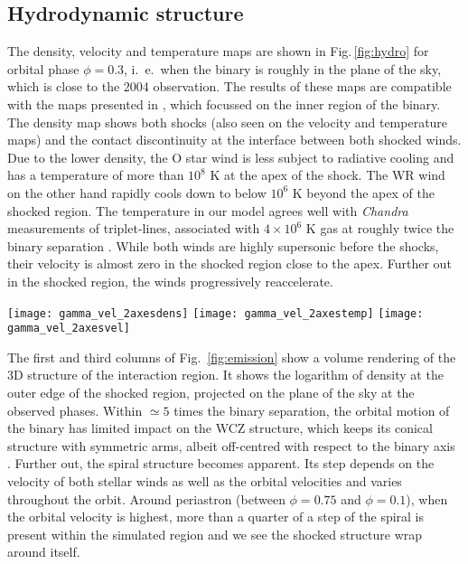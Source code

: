 \documentclass[usenatbib]{mnras}%
\begin{document}
\subsection{Hydrodynamic structure}
The density, velocity and temperature maps are shown in Fig.\,\ref{fig:hydro} for orbital phase $\phi=0.3$, i.\ e.\ when the binary is roughly in the plane of the sky, which is close to the 2004 observation. The results of these maps are compatible with the maps presented in \citet{2005MNRAS.356.1308H}, which focussed on the inner region of the binary. The density map shows both shocks (also seen on the velocity and temperature maps) and the contact discontinuity at the interface between both shocked winds.  Due to the lower density, the O star wind is less subject to radiative cooling and has a temperature of more than $10^8$ K at the apex of the shock. The WR wind on the other hand rapidly cools down to below $10^6$ K beyond the apex of the shocked region. The temperature in our model agrees well with \textit{Chandra} measurements of triplet-lines, associated with $4\times 10^6$ K gas at roughly twice the binary separation \citep{2001ApJ...558L.113S}. While both winds are highly supersonic before the shocks, their velocity is almost zero in the shocked region close to the apex. Further out in the shocked region, the winds progressively reaccelerate.
 \begin{figure*}
   \centering
 \texttt{[image: gamma\_vel\_2axesdens]}
 \texttt{[image: gamma\_vel\_2axestemp]}
 \texttt{[image: gamma\_vel\_2axesvel]}
  \caption{Density (g cm$^{-3}$), temperature (K) and  velocity (km s$^{-1}$) in the midplane of the binary for $\phi=0.3$. The WR star is located in the lower right corner and the O star in the upper left. The length scale is the semi major axis and the plot is centered on the center of mass of the binary. The colliding wind region is wrapped around the O star. }
  \label{fig:hydro}
 \end{figure*}


The first and third columns of Fig.~\ref{fig:emission} show a volume rendering of the 3D structure of the interaction region. It shows the logarithm of density at the outer edge of the shocked region, projected on the plane of the sky at the observed phases. Within $\simeq 5$ times the binary separation, the orbital motion of the binary has limited impact on the WCZ structure, which keeps its conical structure with symmetric arms, albeit off-centred with respect to the binary axis \citep{2008MNRAS.388.1047P}. Further out, the spiral structure becomes apparent. Its step depends on the velocity of both stellar winds as well as the orbital velocities \citep{2012A&A...546A..60L} and varies throughout the orbit. Around periastron (between $\phi=0.75$ and $\phi=0.1$), when the orbital velocity is highest,  more than a quarter of a step of the spiral is present within the simulated region and we see the shocked structure wrap around itself.
\end{document}

